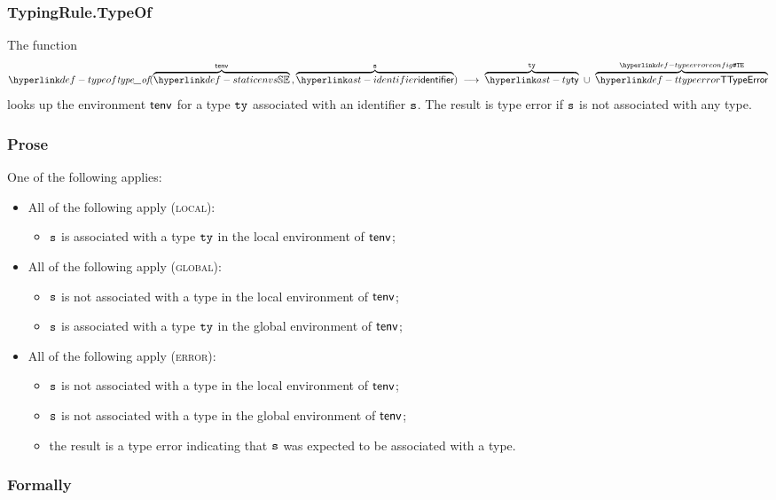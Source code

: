 \subsubsection{TypingRule.TypeOf}
\hypertarget{def-typeof}{}
The function
\[
  \typeof(\overname{\staticenvs}{\tenv} \aslsep \overname{\identifier}{\vs})
  \;\aslto\; \overname{\ty}{\tty}\ \cup\ \overname{\TTypeError}{\TypeErrorConfig}
\]
looks up the environment $\textsf{tenv}$ for a type $\texttt{ty}$ associated with an identifier
$\texttt{s}$. The result is type error if $\texttt{s}$ is not associated with any type.

\subsubsection{Prose}
One of the following applies:
\begin{itemize}
  \item All of the following apply (\textsc{local}):
  \begin{itemize}
    \item $\texttt{s}$ is associated with a type $\texttt{ty}$ in the local environment of $\textsf{tenv}$;
  \end{itemize}

  \item All of the following apply (\textsc{global}):
  \begin{itemize}
    \item $\texttt{s}$ is not associated with a type in the local environment of $\textsf{tenv}$;
    \item $\texttt{s}$ is associated with a type $\texttt{ty}$ in the global environment of $\textsf{tenv}$;
  \end{itemize}

  \item All of the following apply (\textsc{error}):
  \begin{itemize}
    \item $\texttt{s}$ is not associated with a type in the local environment of $\textsf{tenv}$;
    \item $\texttt{s}$ is not associated with a type in the global environment of $\textsf{tenv}$;
    \item the result is a type error indicating that $\texttt{s}$ was expected to be associated
          with a type.
  \end{itemize}
\end{itemize}

\subsubsection{Formally}
